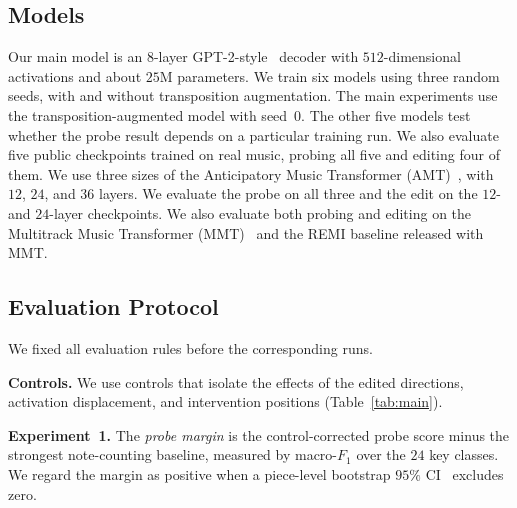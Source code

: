 \documentclass{article}
\begin{document}
\subsection{Models}
\label{sec:models}
Our main model is an $8$-layer GPT-2-style~\cite{vaswani2017attention,radford2019gpt2} decoder with $512$-dimensional activations and about $25$M parameters.
We train six models using three random seeds, with and without transposition augmentation.
The main experiments use the transposition-augmented model with seed~$0$.
The other five models test whether the probe result depends on a particular training run.
We also evaluate five public checkpoints trained on real music, probing all five and editing four of them.
We use three sizes of the Anticipatory Music Transformer (AMT)~\cite{thickstun2023anticipatory}, with $12$, $24$, and $36$ layers.
We evaluate the probe on all three and the edit on the $12$- and $24$-layer checkpoints.
We also evaluate both probing and editing on the Multitrack Music Transformer (MMT)~\cite{dong2023mmt} and the REMI baseline released with MMT.


\subsection{Evaluation Protocol}
\label{sec:measures}
We fixed all evaluation rules before the corresponding runs.

\noindent\textbf{Controls.}
We use controls that isolate the effects of the edited directions, activation displacement, and intervention positions (Table~\ref{tab:main}).

\noindent\textbf{Experiment~1.}
The \emph{probe margin} is the control-corrected probe score minus the strongest note-counting baseline, measured by macro-$F_1$ over the $24$ key classes.
We regard the margin as positive when a piece-level bootstrap $95\%$ CI~\cite{efron1987bca} excludes zero.
\end{document}
